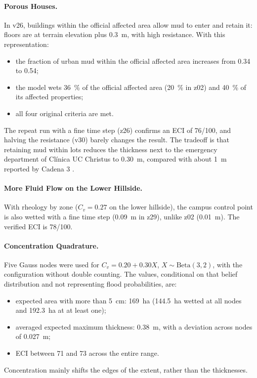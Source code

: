 \paragraph{Porous Houses.} In v26, buildings within the official affected area allow mud to enter and retain it: floors are at terrain elevation plus \SI{0.3}{m}, with high resistance. With this representation:
\begin{itemize}
\item the fraction of urban mud within the official affected area increases from 0.34 to 0.54;
\item the model wets \SI{36}{\percent} of the official affected area (\SI{20}{\percent} in z02) and \SI{40}{\percent} of its affected properties;
\item all four original criteria are met.
\end{itemize}
The repeat run with a fine time step (z26) confirms an ECI of 76/100, and halving the resistance (v30) barely changes the result. The tradeoff is that retaining mud within lots reduces the thickness next to the emergency department of Clínica UC Christus to \SI{0.30}{m}, compared with about \SI{1}{m} reported by Cadena 3 \citep{cadena3_2026}.

\paragraph{More Fluid Flow on the Lower Hillside.} With rheology by zone ($C_v=0.27$ on the lower hillside), the campus control point is also wetted with a fine time step (\SI{0.09}{m} in z29), unlike z02 (\SI{0.01}{m}). The verified ECI is 78/100.

\paragraph{Concentration Quadrature.} Five Gauss nodes were used for $C_v=0.20+0.30X$, $X\sim\mathrm{Beta}(3,2)$, with the configuration without double counting. The values, conditional on that belief distribution and not representing flood probabilities, are:
\begin{itemize}
\item expected area with more than \SI{5}{cm}: \SI{169}{ha} (\SI{144.5}{ha} wetted at all nodes and \SI{192.3}{ha} at at least one);
\item averaged expected maximum thickness: \SI{0.38}{m}, with a deviation across nodes of \SI{0.027}{m};
\item ECI between 71 and 73 across the entire range.
\end{itemize}
Concentration mainly shifts the edges of the extent, rather than the thicknesses.

